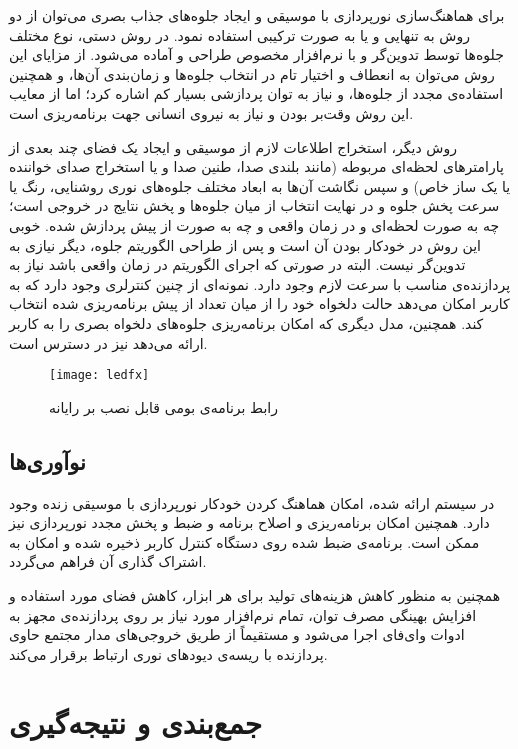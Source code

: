 \documentclass[12pt,twocolumn,a4paper,oneside]{article}
\begin{document}
برای هماهنگ‌سازی نورپردازی با موسیقی و ایجاد جلوه‌های جذاب بصری می‌توان از دو روش به تنهایی و یا به صورت ترکیبی استفاده نمود. در روش دستی، نوع مختلف جلوه‌ها توسط تدوین‌گر و با نرم‌افزار مخصوص طراحی و آماده می‌شود. از مزایای این روش می‌توان به انعطاف و اختیار تام در انتخاب جلوه‌ها و زمان‌بندی آن‌ها، و همچنین استفاده‌ی مجدد از جلوه‌ها، و نیاز به توان پردازشی بسیار کم اشاره کرد؛ اما از معایب این روش وقت‌بر بودن و نیاز به نیروی انسانی جهت برنامه‌ریزی است.

روش دیگر، استخراج اطلاعات لازم از موسیقی و ایجاد یک فضای چند بعدی از پارامترهای لحظه‌ای مربوطه (مانند بلندی صدا، طنین صدا و یا استخراج صدای خواننده یا یک ساز خاص) و سپس نگاشت آن‌ها به ابعاد مختلف جلوه‌های نوری روشنایی، رنگ یا سرعت پخش جلوه و در نهایت انتخاب از میان جلوه‌ها و پخش نتایج در خروجی است؛ چه به صورت لحظه‌ای و در زمان واقعی و چه به صورت از پیش پردازش شده. خوبی این روش در خودکار بودن آن است و پس از طراحی الگوریتم جلوه، دیگر نیازی به تدوین‌گر نیست. البته در صورتی که اجرای الگوریتم در زمان واقعی باشد نیاز به پردازنده‌ی مناسب با سرعت لازم وجود دارد. نمونه‌ای از چنین کنترلری وجود دارد که به کاربر امکان می‌دهد حالت دلخواه خود را از میان تعداد از پیش برنامه‌ریزی شده انتخاب کند\cite{amzn:B0792T73VB}. همچنین، مدل دیگری که امکان برنامه‌ریزی جلوه‌های دلخواه بصری را به کاربر ارائه می‌دهد نیز در دسترس است\cite{amzn:B01M4IX5FF}.

\begin{figure}[ht]
\centering
\texttt{[image: ledfx]}
\caption{رابط برنامه‌ی بومی قابل نصب بر رایانه}
\label{fig:ledfx}
\end{figure}

\subsection{نوآوری‌ها}
در سیستم ارائه شده، امکان هماهنگ کردن خودکار نورپردازی با موسیقی زنده وجود دارد. همچنین امکان برنامه‌ریزی و اصلاح برنامه و ضبط و پخش مجدد نورپردازی نیز ممکن است. برنامه‌ی ضبط شده روی دستگاه کنترل کاربر ذخیره شده و امکان به اشتراک گذاری آن فراهم می‌گردد.

همچنین به منظور کاهش هزینه‌های تولید برای هر ابزار، کاهش فضای مورد استفاده و افزایش بهینگی مصرف توان، تمام نرم‌افزار مورد نیاز بر روی پردازنده‌ی مجهز به ادوات وای‌فای اجرا می‌شود و مستقیماً از طریق خروجی‌های مدار مجتمع حاوی پردازنده با ریسه‌ی دیودهای نوری ارتباط برقرار می‌کند.

\section{جمع‌بندی و نتیجه‌گیری}
\end{document}
